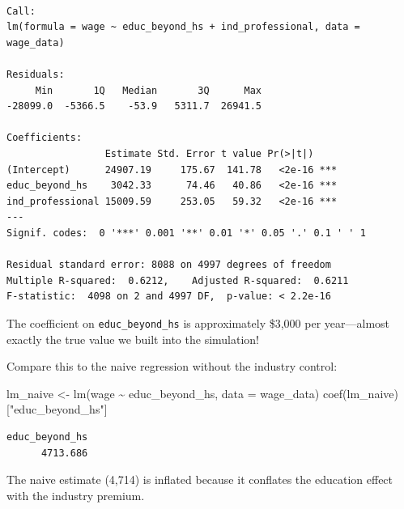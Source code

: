 \documentclass[
  letterpaper,
  DIV=11,
  numbers=noendperiod]{scrreprt}
\newenvironment{Shaded}{\begin{snugshade}}{\end{snugshade}}
\newcommand{\AttributeTok}[1]{\textcolor[rgb]{0.40,0.45,0.13}{#1}}
\newcommand{\FunctionTok}[1]{\textcolor[rgb]{0.28,0.35,0.67}{#1}}
\newcommand{\NormalTok}[1]{\textcolor[rgb]{0.00,0.23,0.31}{#1}}
\newcommand{\OtherTok}[1]{\textcolor[rgb]{0.00,0.23,0.31}{#1}}
\newcommand{\SpecialCharTok}[1]{\textcolor[rgb]{0.37,0.37,0.37}{#1}}
\newcommand{\StringTok}[1]{\textcolor[rgb]{0.13,0.47,0.30}{#1}}
\begin{document}
\begin{verbatim}

Call:
lm(formula = wage ~ educ_beyond_hs + ind_professional, data = wage_data)

Residuals:
     Min       1Q   Median       3Q      Max 
-28099.0  -5366.5    -53.9   5311.7  26941.5 

Coefficients:
                 Estimate Std. Error t value Pr(>|t|)    
(Intercept)      24907.19     175.67  141.78   <2e-16 ***
educ_beyond_hs    3042.33      74.46   40.86   <2e-16 ***
ind_professional 15009.59     253.05   59.32   <2e-16 ***
---
Signif. codes:  0 '***' 0.001 '**' 0.01 '*' 0.05 '.' 0.1 ' ' 1

Residual standard error: 8088 on 4997 degrees of freedom
Multiple R-squared:  0.6212,    Adjusted R-squared:  0.6211 
F-statistic:  4098 on 2 and 4997 DF,  p-value: < 2.2e-16
\end{verbatim}

The coefficient on \texttt{educ\_beyond\_hs} is approximately \$3,000
per year---almost exactly the true value we built into the simulation!

Compare this to the naive regression without the industry control:

\begin{Shaded}
\begin{Highlighting}[]
\NormalTok{lm\_naive }\OtherTok{\textless{}{-}} \FunctionTok{lm}\NormalTok{(wage }\SpecialCharTok{\textasciitilde{}}\NormalTok{ educ\_beyond\_hs, }\AttributeTok{data =}\NormalTok{ wage\_data)}
\FunctionTok{coef}\NormalTok{(lm\_naive)[}\StringTok{"educ\_beyond\_hs"}\NormalTok{]}
\end{Highlighting}
\end{Shaded}

\begin{verbatim}
educ_beyond_hs 
      4713.686 
\end{verbatim}

The naive estimate (4,714) is inflated because it conflates the
education effect with the industry premium.
\end{document}
